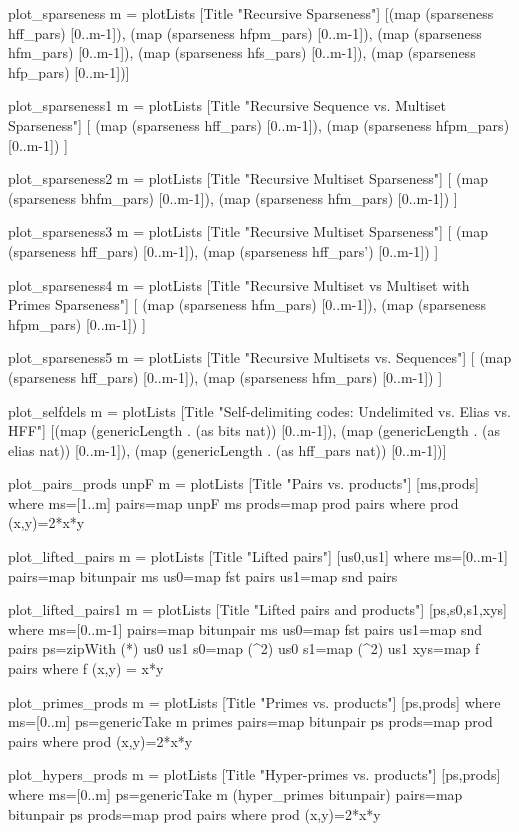 \documentclass[]{INCLUDES/llncs}
\begin{document}
\begin{code}
plot_sparseness m = plotLists [Title "Recursive Sparseness"] 
  [(map (sparseness hff_pars) [0..m-1]),
   (map (sparseness hfpm_pars) [0..m-1]),
   (map (sparseness hfm_pars) [0..m-1]),
   (map (sparseness hfs_pars) [0..m-1]),
   (map (sparseness hfp_pars) [0..m-1])]

plot_sparseness1 m = plotLists 
  [Title "Recursive Sequence vs. Multiset Sparseness"] 
  [
   (map (sparseness hff_pars) [0..m-1]),
   (map (sparseness hfpm_pars) [0..m-1])
  ]
  
plot_sparseness2 m = plotLists [Title "Recursive Multiset Sparseness"] 
  [
   (map (sparseness bhfm_pars) [0..m-1]),
   (map (sparseness hfm_pars) [0..m-1])
  ]

plot_sparseness3 m = plotLists [Title "Recursive Multiset Sparseness"] 
  [
   (map (sparseness hff_pars) [0..m-1]),
   (map (sparseness hff_pars') [0..m-1])
  ]


plot_sparseness4 m = plotLists 
  [Title "Recursive Multiset vs Multiset with Primes Sparseness"] [
   (map (sparseness hfm_pars) [0..m-1]),
   (map (sparseness hfpm_pars) [0..m-1])
  ]

plot_sparseness5 m = plotLists 
  [Title "Recursive Multisets vs. Sequences"] [
   (map (sparseness hff_pars) [0..m-1]),
   (map (sparseness hfm_pars) [0..m-1])
  ]
        
plot_selfdels m = plotLists 
   [Title "Self-delimiting codes: Undelimited vs. Elias vs. HFF"] 
   [(map (genericLength . (as bits nat)) [0..m-1]),
    (map (genericLength . (as elias nat)) [0..m-1]),
    (map (genericLength . (as hff_pars nat)) [0..m-1])]

plot_pairs_prods unpF m = plotLists [Title "Pairs vs. products"]  
   [ms,prods] where
     ms=[1..m]
     pairs=map unpF ms
     prods=map prod pairs where prod (x,y)=2*x*y
 
plot_lifted_pairs m = 
   plotLists [Title "Lifted pairs"]  [us0,us1] where 
     ms=[0..m-1]
     pairs=map bitunpair ms
     us0=map fst pairs
     us1=map snd pairs
     
plot_lifted_pairs1 m = 
   plotLists [Title "Lifted pairs and products"]  [ps,s0,s1,xys] where 
     ms=[0..m-1]
     pairs=map bitunpair ms
     us0=map fst pairs
     us1=map snd pairs
     ps=zipWith (*) us0 us1
     s0=map (^2) us0
     s1=map (^2) us1
     xys=map f pairs where
       f (x,y) = x*y
 
plot_primes_prods m = plotLists [Title "Primes vs. products"]  
  [ps,prods] where 
     ms=[0..m]
     ps=genericTake m primes
     pairs=map bitunpair ps
     prods=map prod pairs where prod (x,y)=2*x*y     
   
plot_hypers_prods m = plotLists [Title "Hyper-primes vs. products"]
   [ps,prods] where 
     ms=[0..m]
     ps=genericTake m (hyper_primes bitunpair)
     pairs=map bitunpair ps
     prods=map prod pairs where prod (x,y)=2*x*y  
\end{code}
\end{document}
